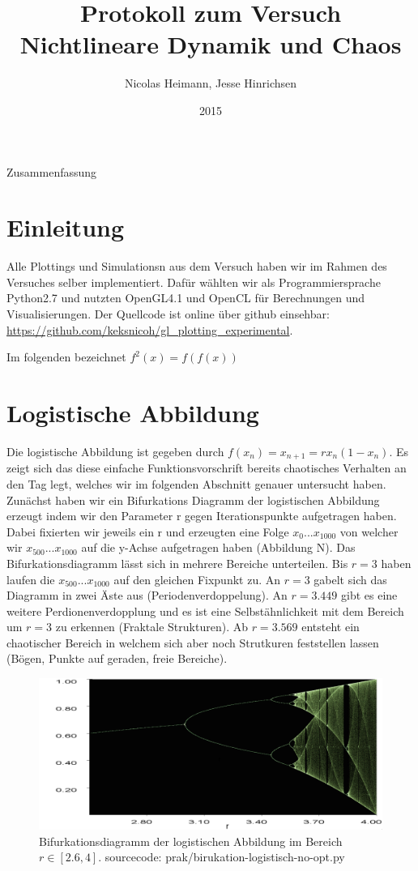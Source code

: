 \documentclass{scrartcl}
\title{Protokoll zum Versuch Nichtlineare Dynamik und Chaos}
\author{Nicolas Heimann, Jesse Hinrichsen}
\affil{\textit{Universität Hamburg}}
\date{2015}
\begin{document}
\maketitle




\begin{description}
\item Zusammenfassung
\end{description}


\section{  Einleitung  }
Alle Plottings und Simulationsn aus dem Versuch haben wir im Rahmen des Versuches selber implementiert. Dafür wählten wir als Programmiersprache Python2.7 und nutzten OpenGL4.1 und OpenCL für Berechnungen und Visualisierungen. Der Quellcode ist online über github einsehbar: \url{https://github.com/keksnicoh/gl_plotting_experimental}.  

Im folgenden bezeichnet $f^2(x) = f(f(x))$

\section{Logistische Abbildung}
Die logistische Abbildung ist gegeben durch $f(x_n)=x_{n+1}=rx_n(1-x_n)$. Es zeigt sich das diese einfache Funktionsvorschrift 
bereits chaotisches Verhalten an den Tag legt, welches wir im folgenden Abschnitt genauer untersucht haben. Zunächst haben 
wir ein Bifurkations Diagramm der logistischen Abbildung erzeugt indem wir den Parameter r gegen Iterationspunkte aufgetragen haben. Dabei fixierten wir jeweils ein r und erzeugten eine Folge $x_0 ... x_{1000}$ von welcher wir $x_{500} ... x_{1000}$ auf die y-Achse aufgetragen haben (Abbildung N).
Das Bifurkationsdiagramm lässt sich in mehrere Bereiche unterteilen. Bis $r=3$ haben laufen die $x_{500}...x_{1000}$ auf den gleichen Fixpunkt zu. An $r=3$ gabelt sich das Diagramm in zwei Äste aus (Periodenverdoppelung). An $r=3.449$ gibt es eine weitere Perdionenverdopplung und es ist eine Selbstähnlichkeit mit dem Bereich um $r=3$ zu erkennen (Fraktale Strukturen). Ab $r=3.569$ entsteht ein chaotischer Bereich in welchem sich aber noch Strutkuren feststellen lassen (Bögen, Punkte auf geraden, freie Bereiche).
\begin{figure}
	\centering
	\includegraphics[scale=0.35]{bifurkation}
	\caption{Bifurkationsdiagramm der logistischen Abbildung im Bereich $r\in[2.6,4]$. sourcecode: prak/birukation-logistisch-no-opt.py}
	\label{bifurkation}
\end{figure}
\end{document}
